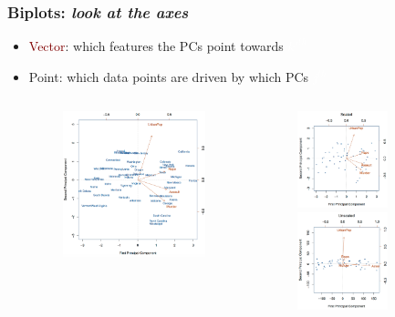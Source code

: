 \documentclass[xcolor={dvipsnames}]{beamer}
\begin{document}
\frame
{
 \frametitle{Biplots: \emph{look at the axes}}

\vspace{-.3em}
\begin{itemize}
\item \textcolor{Maroon}{Vector}: which features the PCs point towards \textcolor{white}{$k'^{th}$} 
\vspace{2.1em}

\item \textcolor{NavyBlue}{Point}: which data points are driven by which PCs \textcolor{white}{$j^{th}$ }
\vspace{2em}

\end{itemize}

\vspace{-3em}

\begin{columns}
\begin{column}{.01\textwidth}
\end{column}
\begin{column}{.4\textwidth}
\begin{figure}
\centering
\includegraphics[width=2.25in]{stuff/biplot.png}
\end{figure}

\end{column}
\begin{column}{.4\textwidth}

\begin{figure}

\vspace{.4em}

\includegraphics[width=1.03in]{stuff/biplot2b.png}

\includegraphics[width=1.03in]{stuff/biplot2.png}
\end{figure}

\end{column}

\end{columns}

}
\end{document}
